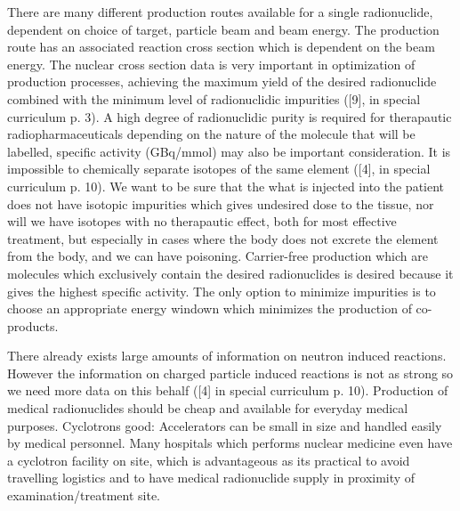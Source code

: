 There are many different production routes available for a single radionuclide, dependent on choice of target, particle beam and beam energy. The production route has an associated reaction cross section which is dependent on the beam energy. The nuclear cross section data is very important in optimization of production processes, achieving the maximum yield of the desired radionuclide combined with the minimum level of radionuclidic impurities ([9], in special curriculum p. 3). A high degree of radionuclidic purity is required for therapautic radiopharmaceuticals depending on the nature of the molecule that will be labelled, specific activity (GBq/mmol) may also be important consideration. It is impossible to chemically separate isotopes of the same element ([4], in special curriculum p. 10). We want to be sure that the what is injected into the patient does not have isotopic impurities which gives undesired dose to the tissue, nor will we have isotopes with no therapautic effect, both for most effective treatment, but especially in cases where the body does not excrete the element from the body, and we can have poisoning. Carrier-free production which are molecules which exclusively contain the desired radionuclides is desired because it gives the highest specific activity. The only option to minimize impurities is to choose an appropriate energy windown which minimizes the production of co-products. 

There already exists large amounts of information on neutron induced reactions. However the information on charged particle induced reactions is not as strong so we need more data on this behalf ([4] in special curriculum p. 10). Production of medical radionuclides should be cheap and available for everyday medical purposes. Cyclotrons good: Accelerators can be small in size and handled easily by medical personnel. Many hospitals which performs nuclear medicine even have a cyclotron facility on site, which is advantageous as its practical to avoid travelling logistics and to have medical radionuclide supply in proximity of examination/treatment site.  




